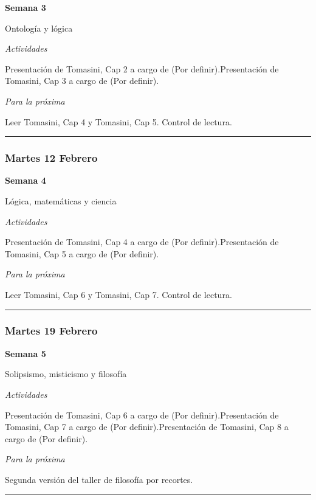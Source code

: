 \documentclass[spanish,]{article}
\begin{document}
\textbf{Semana 3}

Ontología y lógica

\emph{Actividades}

Presentación de Tomasini, Cap 2 a cargo de (Por definir).Presentación de
Tomasini, Cap 3 a cargo de (Por definir).

\emph{Para la próxima}

Leer Tomasini, Cap 4 y Tomasini, Cap 5. Control de lectura.

\begin{center}\rule{0.5\linewidth}{\linethickness}\end{center}

\subsubsection{Martes 12 Febrero}\label{martes-12-febrero}

\textbf{Semana 4}

Lógica, matemáticas y ciencia

\emph{Actividades}

Presentación de Tomasini, Cap 4 a cargo de (Por definir).Presentación de
Tomasini, Cap 5 a cargo de (Por definir).

\emph{Para la próxima}

Leer Tomasini, Cap 6 y Tomasini, Cap 7. Control de lectura.

\begin{center}\rule{0.5\linewidth}{\linethickness}\end{center}

\subsubsection{Martes 19 Febrero}\label{martes-19-febrero}

\textbf{Semana 5}

Solipsismo, misticismo y filosofía

\emph{Actividades}

Presentación de Tomasini, Cap 6 a cargo de (Por definir).Presentación de
Tomasini, Cap 7 a cargo de (Por definir).Presentación de Tomasini, Cap 8
a cargo de (Por definir).

\emph{Para la próxima}

Segunda versión del taller de filosofía por recortes.

\begin{center}\rule{0.5\linewidth}{\linethickness}\end{center}
\end{document}
